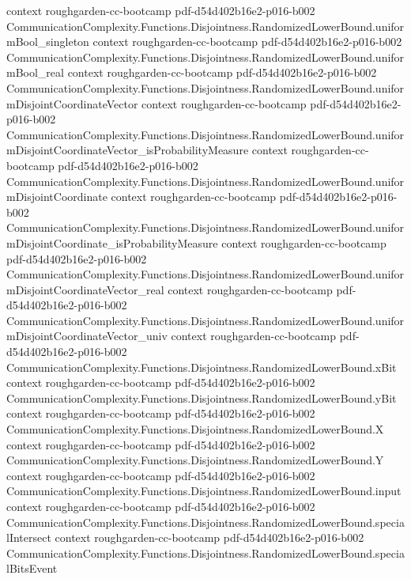 \begin{theorem}
  {context}
  {roughgarden-cc-bootcamp}
  {pdf-d54d402b16e2-p016-b002}
\proofstep
  {CommunicationComplexity.Functions.Disjointness.RandomizedLowerBound.uniformBool_singleton}
  {context}
  {roughgarden-cc-bootcamp}
  {pdf-d54d402b16e2-p016-b002}
\proofstep
  {CommunicationComplexity.Functions.Disjointness.RandomizedLowerBound.uniformBool_real}
  {context}
  {roughgarden-cc-bootcamp}
  {pdf-d54d402b16e2-p016-b002}
\proofstep
  {CommunicationComplexity.Functions.Disjointness.RandomizedLowerBound.uniformDisjointCoordinateVector}
  {context}
  {roughgarden-cc-bootcamp}
  {pdf-d54d402b16e2-p016-b002}
\proofstep
  {CommunicationComplexity.Functions.Disjointness.RandomizedLowerBound.uniformDisjointCoordinateVector_isProbabilityMeasure}
  {context}
  {roughgarden-cc-bootcamp}
  {pdf-d54d402b16e2-p016-b002}
\proofstep
  {CommunicationComplexity.Functions.Disjointness.RandomizedLowerBound.uniformDisjointCoordinate}
  {context}
  {roughgarden-cc-bootcamp}
  {pdf-d54d402b16e2-p016-b002}
\proofstep
  {CommunicationComplexity.Functions.Disjointness.RandomizedLowerBound.uniformDisjointCoordinate_isProbabilityMeasure}
  {context}
  {roughgarden-cc-bootcamp}
  {pdf-d54d402b16e2-p016-b002}
\proofstep
  {CommunicationComplexity.Functions.Disjointness.RandomizedLowerBound.uniformDisjointCoordinateVector_real}
  {context}
  {roughgarden-cc-bootcamp}
  {pdf-d54d402b16e2-p016-b002}
\proofstep
  {CommunicationComplexity.Functions.Disjointness.RandomizedLowerBound.uniformDisjointCoordinateVector_univ}
  {context}
  {roughgarden-cc-bootcamp}
  {pdf-d54d402b16e2-p016-b002}
\proofstep
  {CommunicationComplexity.Functions.Disjointness.RandomizedLowerBound.xBit}
  {context}
  {roughgarden-cc-bootcamp}
  {pdf-d54d402b16e2-p016-b002}
\proofstep
  {CommunicationComplexity.Functions.Disjointness.RandomizedLowerBound.yBit}
  {context}
  {roughgarden-cc-bootcamp}
  {pdf-d54d402b16e2-p016-b002}
\proofstep
  {CommunicationComplexity.Functions.Disjointness.RandomizedLowerBound.X}
  {context}
  {roughgarden-cc-bootcamp}
  {pdf-d54d402b16e2-p016-b002}
\proofstep
  {CommunicationComplexity.Functions.Disjointness.RandomizedLowerBound.Y}
  {context}
  {roughgarden-cc-bootcamp}
  {pdf-d54d402b16e2-p016-b002}
\proofstep
  {CommunicationComplexity.Functions.Disjointness.RandomizedLowerBound.input}
  {context}
  {roughgarden-cc-bootcamp}
  {pdf-d54d402b16e2-p016-b002}
\proofstep
  {CommunicationComplexity.Functions.Disjointness.RandomizedLowerBound.specialIntersect}
  {context}
  {roughgarden-cc-bootcamp}
  {pdf-d54d402b16e2-p016-b002}
\proofstep
  {CommunicationComplexity.Functions.Disjointness.RandomizedLowerBound.specialBitsEvent}

\end{theorem}
